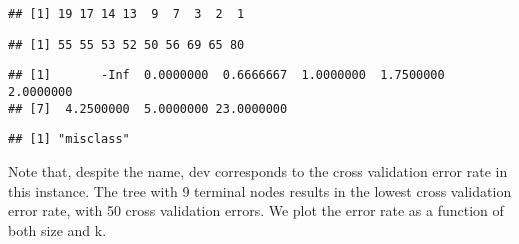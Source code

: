 \documentclass[]{article}
\newenvironment{Shaded}{\begin{snugshade}}{\end{snugshade}}
\newcommand{\KeywordTok}[1]{\textcolor[rgb]{0.13,0.29,0.53}{\textbf{#1}}}
\newcommand{\DataTypeTok}[1]{\textcolor[rgb]{0.13,0.29,0.53}{#1}}
\newcommand{\DecValTok}[1]{\textcolor[rgb]{0.00,0.00,0.81}{#1}}
\newcommand{\StringTok}[1]{\textcolor[rgb]{0.31,0.60,0.02}{#1}}
\newcommand{\OperatorTok}[1]{\textcolor[rgb]{0.81,0.36,0.00}{\textbf{#1}}}
\newcommand{\NormalTok}[1]{#1}
\begin{document}
\begin{verbatim}
## [1] 19 17 14 13  9  7  3  2  1
\end{verbatim}

\begin{Shaded}
\end{Shaded}

\begin{verbatim}
## [1] 55 55 53 52 50 56 69 65 80
\end{verbatim}

\begin{Shaded}
\end{Shaded}

\begin{verbatim}
## [1]       -Inf  0.0000000  0.6666667  1.0000000  1.7500000  2.0000000
## [7]  4.2500000  5.0000000 23.0000000
\end{verbatim}

\begin{Shaded}
\end{Shaded}

\begin{verbatim}
## [1] "misclass"
\end{verbatim}

Note that, despite the name, dev corresponds to the cross validation
error rate in this instance. The tree with 9 terminal nodes results in
the lowest cross validation error rate, with 50 cross validation errors.
We plot the error rate as a function of both size and k.

\begin{Shaded}
\end{Shaded}
\end{document}
